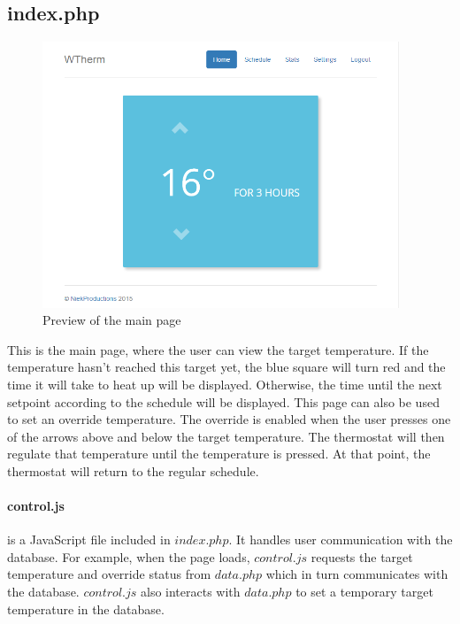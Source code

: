 \documentclass[12pt,a4paper,final]{report}
\begin{document}
\subsection*{index.php}
\begin{figure}[H]
  \begin{center}
      \includegraphics[width=0.95\textwidth]{ui/index}
  \end{center}
  \caption{Preview of the main page}
\end{figure}
This is the main page, where the user can view the target temperature. If the temperature hasn't reached this target yet, the blue square will turn red and the time it will take to heat up will be displayed. Otherwise, the time until the next setpoint according to the schedule will be displayed. This page can also be used to set an override temperature. The override is enabled when the user presses one of the arrows above and below the target temperature. The thermostat will then regulate that temperature until the temperature is pressed. At that point, the thermostat will return to the regular schedule.
\paragraph{control.js} is a JavaScript file included in $index.php$. It handles user communication with the database. For example, when the page loads, $control.js$ requests the target temperature and override status from $data.php$ which in turn communicates with the database. $control.js$ also interacts with $data.php$ to set a temporary target temperature in the database.
\end{document}
